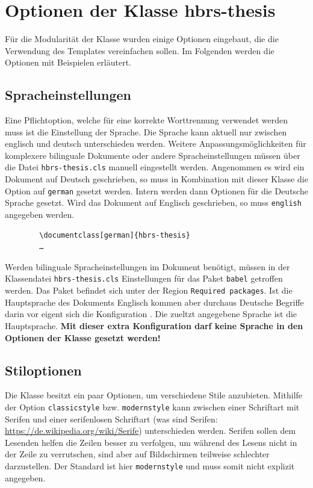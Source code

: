 \chapter{Optionen der Klasse hbrs-thesis}
\label{chap:klassenoptionen}
Für die Modularität der Klasse wurden einige Optionen eingebaut, die die Verwendung des Templates vereinfachen sollen. Im Folgenden werden die Optionen mit Beispielen erläutert.

\section{Spracheinstellungen}
Eine Pflichtoption, welche für eine korrekte Worttrennung verwendet werden muss ist die Einstellung der Sprache. Die Sprache kann aktuell nur zwischen englisch und deutsch unterschieden werden. Weitere Anpassungsmöglichkeiten für komplexere bilinguale Dokumente oder andere Spracheinstellungen müssen über die Datei \texttt{hbrs-thesis.cls} manuell eingestellt werden. Angenommen es wird ein Dokument auf Deutsch geschrieben, so muss in Kombination mit dieser Klasse die Option auf \texttt{german} gesetzt werden. Intern werden dann Optionen für die Deutsche Sprache gesetzt. Wird das Dokument auf Englisch geschrieben, so muss \texttt{english} angegeben werden. 

\begin{cde}
    \begin{verbatim}
        \documentclass[german]{hbrs-thesis}
        …
    \end{verbatim}
\end{cde}

Werden bilinguale Spracheinstellungen im Dokument benötigt, müssen in der Klassendatei \texttt{hbrs-thesis.cls} Einstellungen für das Paket \texttt{babel} getroffen werden. Das Paket befindet sich unter der Region \texttt{Required packages}. Ist die Hauptsprache des Dokuments Englisch kommen aber durchaus Deutsche Begriffe darin vor eigent sich die Konfiguration \texttt{}. Die zueltzt angegebene Sprache ist die Hauptsprache. \textbf{Mit dieser extra Konfiguration darf keine Sprache in den Optionen der Klasse gesetzt werden!}

\section{Stiloptionen}
Die Klasse besitzt ein paar Optionen, um verschiedene Stile anzubieten. Mithilfe der Option \texttt{classicstyle} bzw. \texttt{modernstyle} kann zwischen einer Schriftart mit Serifen und einer serifenlosen Schriftart (was sind Serifen: \url{https://de.wikipedia.org/wiki/Serife}) unterschieden werden. Serifen sollen dem Lesenden helfen die Zeilen besser zu verfolgen, um während des Lesens nicht in der Zeile zu verrutschen, sind aber auf Bildschirmen teilweise schlechter darzustellen. Der Standard ist hier \texttt{modernstyle} und muss somit nicht explizit angegeben.

